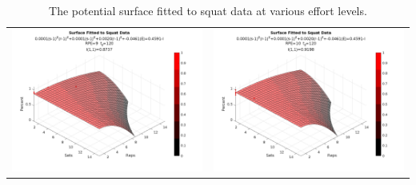 \begin{table}[h]
\begin{tabular}{c|c}
        \includegraphics[width=78mm]{SquatSurface/9.png} &
        \includegraphics[width=78mm]{SquatSurface/10.png} \\
    \end{tabular}
    \caption{The potential surface fitted to squat data at various effort levels.}
    \label{tab:AppBSquatPotentialSurfaceAcrossEffort}
\end{table}

